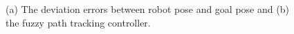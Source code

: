 \documentclass[conference]{IEEEtran}
\begin{document}
\begin{figure}[!ht]
	\centering
	\caption{(a) The deviation errors between robot pose and goal pose and (b) the fuzzy path tracking controller.}
	\label{fig:ptc_and_errors}
\end{figure}
\end{document}
